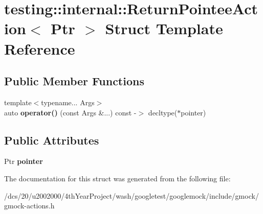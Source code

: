 \hypertarget{structtesting_1_1internal_1_1ReturnPointeeAction}{}\section{testing\+:\+:internal\+:\+:Return\+Pointee\+Action$<$ Ptr $>$ Struct Template Reference}
\label{structtesting_1_1internal_1_1ReturnPointeeAction}
\subsection*{Public Member Functions}
\begin{DoxyCompactItemize}
\item 
\mbox{\label{structtesting_1_1internal_1_1ReturnPointeeAction_a9d584cc4745e0a3792c1fb1d7ff6b3c1}} 
{\footnotesize template$<$typename... Args$>$ }\\auto {\bfseries operator()} (const Args \&...) const -\/$>$ decltype($\ast$pointer)
\end{DoxyCompactItemize}
\subsection*{Public Attributes}
\begin{DoxyCompactItemize}
\item 
\mbox{\label{structtesting_1_1internal_1_1ReturnPointeeAction_a9efabbdb91f93de7e15e3c23a6f1a83b}} 
Ptr {\bfseries pointer}
\end{DoxyCompactItemize}


The documentation for this struct was generated from the following file\+:\begin{DoxyCompactItemize}
\item 
/dcs/20/u2002000/4th\+Year\+Project/wash/googletest/googlemock/include/gmock/gmock-\/actions.\+h\end{DoxyCompactItemize}
